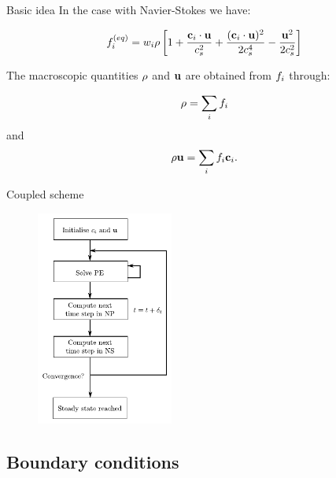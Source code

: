 \begin{frame}{Basic idea}
In the case with Navier-Stokes we have:

\begin{equation}\label{eq:lbm:ns_eq}
\feq = w_i\rho \left [ 1 + \frac{\ci \cdot \ubf}{c_s^2} +
  \frac{(\ci \cdot \ubf)^2}{2c_s^4} - \frac{\ubf^2}{2c_s^2} \right]
\end{equation}

The macroscopic quantities $\mathrm{\rho}$ and $\mathbf{u}$ are obtained from
$f_i$ through:

\begin{equation}\label{eq:lbm:rho_mom}
\rhorm = \sum_i \fii
\end{equation}
and
\begin{equation}\label{eq:lbm:j_mom}
\rhorm \ubf = \sum_i \fii \ci .
\end{equation}

\end{frame}

\begin{frame}{Coupled scheme}
\begin{figure}
\begin{center}
\includegraphics[width=0.4\textwidth]{../fig/full_algorithm.pdf}
\end{center}
\end{figure}
\end{frame}

\subsection{Boundary conditions}

